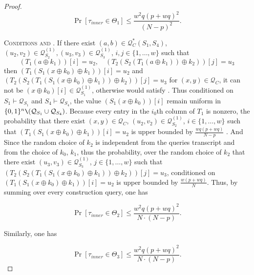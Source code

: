 \begin{proof}
$$
\operatorname{Pr}\left[\tau_{inner} \in \Theta_{1}\right] \leq \frac{w^{2} q (p+w q)^{2}}{(N-p)^{2}}.
$$


\textsc{Conditions \ctwo and \cthree}. If there exist $(a, b) \in \mathcal{Q}_{C}^{*}\left(S_{1}, S_{4}\right)$, $(u_{2},v_{2}) \in \mathcal{Q}_{S_{2}}^{(1)}, (u_{3}, v_{3}) \in \mathcal{Q}_{S_{3}}^{(1)}$, $i, j \in\{1, \ldots, w\}$ such that 
$$\left(T_1\left(a \oplus k_{1}\right)\right)[i] = u_2,  \quad \left(T_{2}\left(S_{2}\left(T_1\left(a \oplus k_{1}\right)\right) \oplus k_{2}\right)\right)[j] = u_3$$
 \noindent then $\left(T_{1}\left(S_{1}\left(x \oplus k_{0}\right) \oplus k_{1}\right)\right)[i]=u_2$ and $\left(T_{2}\left(S_{2}\left(T_{1}\left(S_{1}\left(x \oplus k_{0}\right) \oplus k_{1}\right)\right) \oplus k_{2}\right)\right)[j]=u_{3}$ for $(x, y) \in \mathcal{Q}_{C}$, it can not be $\left(x \oplus k_{0}\right)[i] \in \mathcal{Q}_{S_{1}}^{(1)}$, otherwise would satisfy \btwo. Thus conditioned on $S_{1} \vdash \mathcal{Q}_{S_{1}}$ and $S_{4} \vdash \mathcal{Q}_{S_{4}}$, the value $\left(S_{1}\left(x \oplus k_{0}\right)\right)[i]$ remain uniform in $\{0, 1\}^{n} \verb|\| (\mathcal{Q}_{S_{1}} \cup \mathcal{Q}_{S_{4}})$. Because every entry in the $i_{0}$th column of $T_{1}$ is nonzero, the probability that there exist $(x, y) \in \mathcal{Q}_{C}$, $(u_{2}, v_{2}) \in \mathcal{Q}_{S_{2}}^{(1)}$, $i \in\{1, \ldots, w\}$ such that $\left(T_{1}\left(S_{1}\left(x \oplus k_{0}\right) \oplus k_{1}\right)\right)[i]=u_2$ is upper bounded by $\frac{w q (p+w q)}{N-p}$ . And Since the random choice of $k_{2}$ is independent from the queries transcript and from the choice of $k_{0}$, $k_{1}$, thus the probability, over the random choice of $k_{2}$ that there exist $(u_{3}, v_{3}) \in \mathcal{Q}_{S_{3}}^{(1)}$, $j \in\{1, \ldots, w\}$ such that $\left(T_{2}\left(S_{2}\left(T_{1}\left(S_{1}\left(x \oplus k_{0}\right) \oplus k_{1}\right)\right) \oplus k_{2}\right)\right)[j]=u_{3}$, conditioned on $\left(T_{1}\left(S_{1}\left(x \oplus k_{0}\right) \oplus k_{1}\right)\right)[i]=u_2$ is upper bounded by $\frac{w (p+w q)}{N}$. Thus, by summing over every construction query, one has

$$
\operatorname{Pr}\left[\tau_{inner} \in \Theta_{2}\right] \leq \frac{w^{2} q (p+w q)^{2}}{N \cdot (N-p)}.
$$


Similarly, one has

$$
\operatorname{Pr}\left[\tau_{inner} \in \Theta_{3}\right] \leq \frac{w^{2} q (p+w q)^{2}}{N \cdot (N-p)}.
$$




\end{proof}
